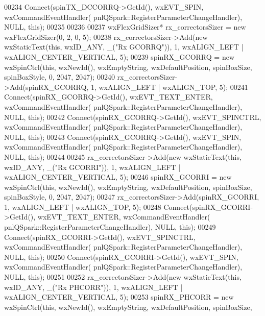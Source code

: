 \begin{DoxyCode}
00234     Connect(spinTX_DCCORRQ->GetId(), wxEVT\_SPIN, wxCommandEventHandler(
      pnlQSpark::RegisterParameterChangeHandler), NULL, \textcolor{keyword}{this});
00235 
00236 
00237     wxFlexGridSizer* rx\_correctorsSizer = \textcolor{keyword}{new} wxFlexGridSizer(0, 2, 0, 5);
00238     rx\_correctorsSizer->Add(\textcolor{keyword}{new} wxStaticText(\textcolor{keyword}{this}, wxID\_ANY, \_(\textcolor{stringliteral}{"Rx GCORRQ"})), 1, wxALIGN\_LEFT | 
      wxALIGN\_CENTER\_VERTICAL, 5);
00239     spinRX_GCORRQ = \textcolor{keyword}{new} wxSpinCtrl(\textcolor{keyword}{this}, wxNewId(), wxEmptyString, wxDefaultPosition, spinBoxSize, 
      spinBoxStyle, 0, 2047, 2047);
00240     rx\_correctorsSizer->Add(spinRX_GCORRQ, 1, wxALIGN\_LEFT | wxALIGN\_TOP, 5);
00241     Connect(spinRX_GCORRQ->GetId(), wxEVT\_TEXT\_ENTER, wxCommandEventHandler(
      pnlQSpark::RegisterParameterChangeHandler), NULL, \textcolor{keyword}{this});
00242     Connect(spinRX_GCORRQ->GetId(), wxEVT\_SPINCTRL, wxCommandEventHandler(
      pnlQSpark::RegisterParameterChangeHandler), NULL, \textcolor{keyword}{this});
00243     Connect(spinRX_GCORRQ->GetId(), wxEVT\_SPIN, wxCommandEventHandler(
      pnlQSpark::RegisterParameterChangeHandler), NULL, \textcolor{keyword}{this});
00244 
00245     rx\_correctorsSizer->Add(\textcolor{keyword}{new} wxStaticText(\textcolor{keyword}{this}, wxID\_ANY, \_(\textcolor{stringliteral}{"Rx GCORRI"})), 1, wxALIGN\_LEFT | 
      wxALIGN\_CENTER\_VERTICAL, 5);
00246     spinRX_GCORRI = \textcolor{keyword}{new} wxSpinCtrl(\textcolor{keyword}{this}, wxNewId(), wxEmptyString, wxDefaultPosition, spinBoxSize, 
      spinBoxStyle, 0, 2047, 2047);
00247     rx\_correctorsSizer->Add(spinRX_GCORRI, 1, wxALIGN\_LEFT | wxALIGN\_TOP, 5);
00248     Connect(spinRX_GCORRI->GetId(), wxEVT\_TEXT\_ENTER, wxCommandEventHandler(
      pnlQSpark::RegisterParameterChangeHandler), NULL, \textcolor{keyword}{this});
00249     Connect(spinRX_GCORRI->GetId(), wxEVT\_SPINCTRL, wxCommandEventHandler(
      pnlQSpark::RegisterParameterChangeHandler), NULL, \textcolor{keyword}{this});
00250     Connect(spinRX_GCORRI->GetId(), wxEVT\_SPIN, wxCommandEventHandler(
      pnlQSpark::RegisterParameterChangeHandler), NULL, \textcolor{keyword}{this});
00251 
00252     rx\_correctorsSizer->Add(\textcolor{keyword}{new} wxStaticText(\textcolor{keyword}{this}, wxID\_ANY, \_(\textcolor{stringliteral}{"Rx PHCORR"})), 1, wxALIGN\_LEFT | 
      wxALIGN\_CENTER\_VERTICAL, 5);
00253     spinRX_PHCORR = \textcolor{keyword}{new} wxSpinCtrl(\textcolor{keyword}{this}, wxNewId(), wxEmptyString, wxDefaultPosition, spinBoxSize, 

\end{DoxyCode}
